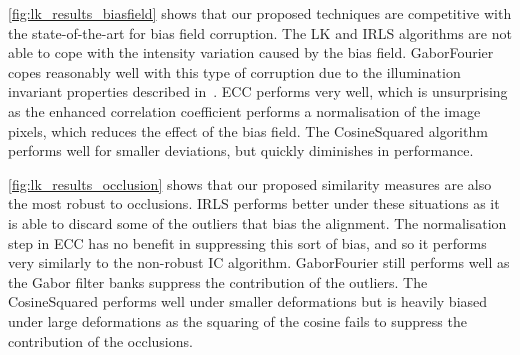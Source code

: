 \cref{fig:lk_results_biasfield} shows that our proposed techniques are
competitive with the state-of-the-art for bias field corruption. The LK and IRLS
algorithms are not able to cope with the intensity variation caused by the bias
field. GaborFourier copes reasonably well with this type of corruption due to
the illumination invariant properties described in~\cite{lucey2013fourier}. ECC
performs very well, which is unsurprising as the enhanced correlation
coefficient performs a normalisation of the image pixels, which reduces the
effect of the bias field. The CosineSquared algorithm performs well for smaller
deviations, but quickly diminishes in performance.

\cref{fig:lk_results_occlusion} shows that our proposed similarity
measures are also the most robust to occlusions. IRLS performs better under
these situations as it is able to discard some of the outliers that bias the
alignment. The normalisation step in ECC has no benefit in suppressing this sort
of bias, and so it performs very similarly to the non-robust IC algorithm.
GaborFourier still performs well as the Gabor filter banks suppress the
contribution of the outliers. The CosineSquared performs well under smaller
deformations but is heavily biased under large deformations as the squaring of
the cosine fails to suppress the contribution of the occlusions.

